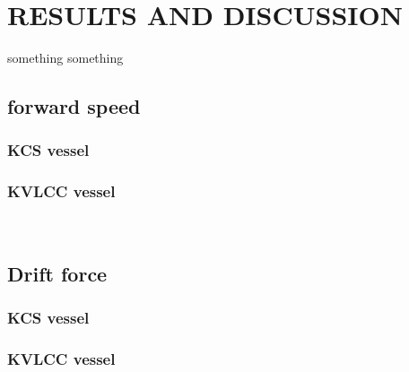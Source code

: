 \chapter{RESULTS AND DISCUSSION}
something something
\section{forward speed}
\subsection{KCS vessel}
\subsection{KVLCC vessel}

\\

\section{Drift force}
\subsection{KCS vessel}
\subsection{KVLCC vessel}
